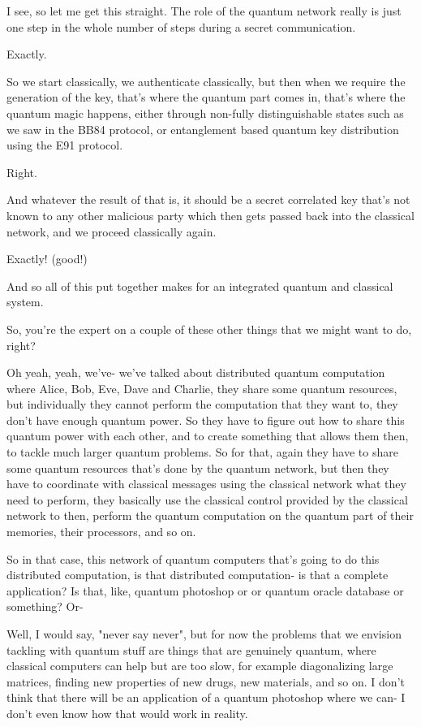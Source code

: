 I see, so let me get this straight. The role of the quantum network really is just one step in the whole number of steps during a secret communication.

Exactly.

So we start classically, we authenticate classically, but then when we require the generation of the key, that's where the quantum part comes in, that's where the quantum magic happens, either through non-fully distinguishable states such as we saw in the BB84 protocol, or entanglement based quantum key distribution using the E91 protocol.

Right.

And whatever the result of that is, it should be a secret correlated key that's not known to any other malicious party which then gets passed back into the classical network, and we proceed classically again.

Exactly! (good!)

And so all of this put together makes for an integrated quantum and classical system.

So, you're the expert on a couple of these other things that we might want to do, right?

Oh yeah, yeah, we've- we've talked about distributed quantum computation where Alice, Bob, Eve, Dave and Charlie, they share some quantum resources, but individually they cannot perform the computation that they want to, they don't have enough quantum power. So they have to figure out how to share this quantum power with each other, and to create something that allows them then, to tackle much larger quantum problems. So for that, again they have to share some quantum resources that's done by the quantum network, but then they have to coordinate with classical messages using the classical network what they need to perform, they basically use the classical control provided by the classical network to then, perform the quantum computation on the quantum part of their memories, their processors, and so on.

So in that case, this network of quantum computers that's going to do this distributed computation, is that distributed computation- is that a complete application? Is that, like, quantum photoshop or or quantum oracle database or something? Or-

Well, I would say, "never say never", but for now the problems that we envision tackling with quantum stuff are things that are genuinely quantum, where classical computers can help but are too slow, for example diagonalizing large matrices, finding new properties of new drugs, new materials, and so on. I don't think that there will be an application of a quantum photoshop where we can- I don't even know how that would work in reality.

